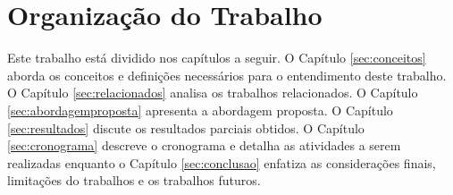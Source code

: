 \section{Organização do Trabalho}
Este trabalho está dividido nos capítulos a seguir. O Capítulo \ref{sec:conceitos} aborda os conceitos e definições necessários para o entendimento deste trabalho. O Capítulo \ref{sec:relacionados} analisa os trabalhos relacionados. O Capítulo \ref{sec:abordagemproposta} apresenta a abordagem proposta. O Capítulo \ref{sec:resultados} discute os resultados parciais obtidos. O Capítulo \ref{sec:cronograma} descreve o cronograma e detalha as atividades a serem realizadas enquanto o Capítulo \ref{sec:conclusao} enfatiza as considerações finais, limitações do trabalhos e os trabalhos futuros.